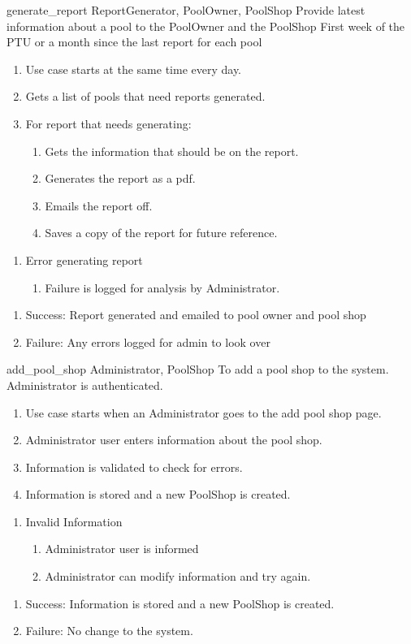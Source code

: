 \usecase
{generate\_report}
{ReportGenerator, PoolOwner, PoolShop}
{Provide latest information about a pool to the PoolOwner and the PoolShop}
{First week of the PTU or a month since the last report for each pool}
{
\begin{enumerate}
\item Use case starts at the same time every day.
\item Gets a list of pools that need reports generated.
\item For report that needs generating:
\begin{enumerate}
\item Gets the information that should be on the report.
\item Generates the report as a pdf.
\item Emails the report off.
\item Saves a copy of the report for future reference.
\end{enumerate}
\end{enumerate}
}
{
\begin{enumerate}
\item Error generating report
\begin{enumerate}
\item Failure is logged for analysis by Administrator.
\end{enumerate}
\end{enumerate}
}
{
\begin{enumerate}
\item Success: Report generated and emailed to pool owner and pool shop
\item Failure: Any errors logged for admin to look over
\end{enumerate}
}

\usecase
{add\_pool\_shop}
{Administrator, PoolShop}
{To add a pool shop to the system.}
{Administrator is authenticated.}
{
\begin{enumerate}
\item Use case starts when an Administrator goes to the add pool shop page.
\item Administrator user enters information about the pool shop.
\item Information is validated to check for errors.
\item Information is stored and a new PoolShop is created.
\end{enumerate}
}
{
\begin{enumerate}
\item Invalid Information
\begin{enumerate}
\item Administrator user is informed
\item Administrator can modify information and try again.
\end{enumerate}
\end{enumerate}
}
{
\begin{enumerate}
\item Success: Information is stored and a new PoolShop is created.
\item Failure: No change to the system.
\end{enumerate}
}

